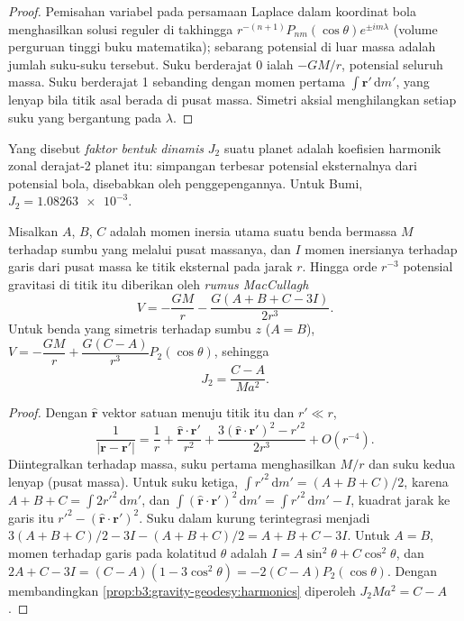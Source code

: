 \begin{proof}
Pemisahan variabel pada persamaan Laplace dalam koordinat bola
menghasilkan solusi reguler di takhingga $r^{-(n+1)}P_{nm}(\cos\theta)e^{\pm
im\lambda}$ (volume perguruan tinggi buku matematika); sebarang potensial di luar
massa adalah jumlah suku-suku tersebut. Suku berderajat 0 ialah $-GM/r$, potensial
seluruh massa. Suku berderajat 1 sebanding dengan momen pertama
$\int\mathbf r'\,\mathrm dm'$, yang lenyap bila titik asal berada di pusat
massa. Simetri aksial menghilangkan setiap suku yang bergantung pada $\lambda$.
\end{proof}

\begin{definition}\label{def:b3:gravity-geodesy:j2}
Yang disebut \emph{faktor bentuk dinamis} $J_2$ suatu planet
adalah koefisien harmonik zonal derajat-2 planet itu: simpangan terbesar
potensial eksternalnya dari potensial bola, disebabkan oleh penggepengannya. Untuk
Bumi, $J_2 = \num{1.08263e-3}$.
\end{definition}

\begin{theorem}\label{thm:b3:gravity-geodesy:maccullagh}
Misalkan $A$, $B$, $C$ adalah momen inersia utama suatu benda bermassa $M$
terhadap sumbu yang melalui pusat massanya, dan $I$ momen inersianya terhadap
garis dari pusat massa ke titik eksternal pada jarak $r$. Hingga orde
$r^{-3}$ potensial gravitasi di titik itu diberikan oleh
\emph{rumus MacCullagh}
\[
  V = -\frac{GM}{r} - \frac{G(A + B + C - 3I)}{2r^3} .
\]
Untuk benda yang simetris terhadap sumbu $z$ ($A = B$),
$V = -\dfrac{GM}{r} + \dfrac{G(C - A)}{r^3}P_2(\cos\theta)$, sehingga
\[
  J_2 = \frac{C - A}{Ma^2} .
\]
\end{theorem}

\begin{proof}
Dengan $\hat{\mathbf r}$ vektor satuan menuju titik itu dan $r' \ll r$,
\[
  \frac{1}{|\mathbf r - \mathbf r'|} = \frac1r + \frac{\hat{\mathbf r}\cdot\mathbf r'}{r^2}
  + \frac{3(\hat{\mathbf r}\cdot\mathbf r')^2 - r'^2}{2r^3} + O(r^{-4}).
\]
Diintegralkan terhadap massa, suku pertama menghasilkan $M/r$ dan suku kedua lenyap
(pusat massa). Untuk suku ketiga, $\int r'^2\,\mathrm dm' = (A + B + C)/2$, karena
$A + B + C = \int 2r'^2\,\mathrm dm'$, dan $\int(\hat{\mathbf r}\cdot\mathbf
r')^2\,\mathrm dm' = \int r'^2\,\mathrm dm' - I$, kuadrat jarak ke
garis itu $r'^2 - (\hat{\mathbf r}\cdot\mathbf r')^2$. Suku dalam kurung terintegrasi
menjadi $3(A + B + C)/2 - 3I - (A + B + C)/2 = A + B + C - 3I$. Untuk $A = B$, momen
terhadap garis pada kolatitud $\theta$ adalah $I = A\sin^2\theta + C\cos^2\theta$,
dan $2A + C - 3I = (C - A)(1 - 3\cos^2\theta) = -2(C - A)P_2(\cos\theta)$.
Dengan membandingkan \cref{prop:b3:gravity-geodesy:harmonics} diperoleh
$J_2Ma^2 = C - A$.
\end{proof}

